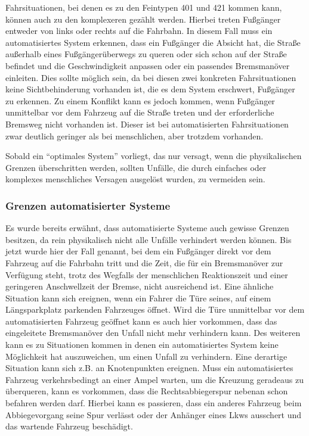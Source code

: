 Fahrsituationen, bei denen es zu den Feintypen 401 und 421 kommen kann, können auch zu den komplexeren gezählt werden. Hierbei treten Fußgänger entweder von links oder rechts auf die Fahrbahn. In diesem Fall muss ein automatisiertes System erkennen, dass ein Fußgänger die Absicht hat, die Straße außerhalb eines Fußgängerüberwegs zu queren oder sich schon auf der Straße befindet und die Geschwindigkeit anpassen oder ein passendes Bremsmanöver einleiten. Dies sollte möglich sein, da bei diesen zwei konkreten Fahrsituationen keine Sichtbehinderung vorhanden ist, die es dem System erschwert, Fußgänger zu erkennen. Zu einem Konflikt kann es jedoch kommen, wenn Fußgänger unmittelbar vor dem Fahrzeug auf die Straße treten und der erforderliche Bremsweg nicht vorhanden ist. Dieser ist bei automatisierten Fahrsituationen zwar deutlich geringer als bei menschlichen, aber trotzdem vorhanden.

Sobald ein \enquote{optimales System} vorliegt, das nur versagt, wenn die physikalischen Grenzen überschritten werden, sollten Unfälle, die durch einfaches oder komplexes menschliches Versagen ausgelöst wurden, zu vermeiden sein.

\subsubsection{Grenzen automatisierter Systeme}
Es wurde bereits erwähnt, dass automatisierte Systeme auch gewisse Grenzen besitzen, da rein physikalisch nicht alle Unfälle verhindert werden können. Bis jetzt wurde hier der Fall genannt, bei dem ein Fußgänger direkt vor dem Fahrzeug auf die Fahrbahn tritt und die Zeit, die für ein Bremsmanöver zur Verfügung steht, trotz des Wegfalls der menschlichen Reaktionszeit und einer geringeren Anschwellzeit der Bremse, nicht ausreichend ist. Eine ähnliche Situation kann sich ereignen, wenn ein Fahrer die Türe seines, auf einem Längsparkplatz parkenden Fahrzeuges öffnet. Wird die Türe unmittelbar vor dem automatisierten Fahrzeug geöffnet kann es auch hier vorkommen, dass das eingeleitete Bremsmanöver den Unfall nicht mehr verhindern kann. Des weiteren kann es zu Situationen kommen in denen ein automatisiertes System keine Möglichkeit hat auszuweichen, um einen Unfall zu verhindern. Eine derartige Situation kann sich z.B. an Knotenpunkten ereignen. Muss ein automatisiertes Fahrzeug verkehrsbedingt an einer Ampel warten, um die Kreuzung geradeaus zu überqueren, kann es vorkommen, dass die Rechtsabbiegerspur nebenan schon befahren werden darf. Hierbei kann es passieren, dass ein anderes Fahrzeug beim Abbiegevorgang seine Spur verlässt oder der Anhänger eines Lkws ausschert und das wartende Fahrzeug beschädigt.

